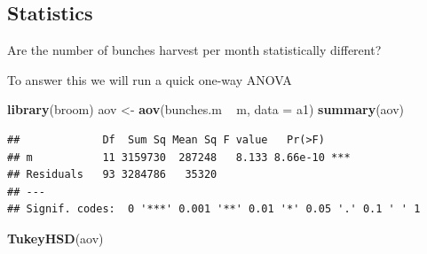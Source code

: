 \documentclass[]{book}
\newenvironment{Shaded}{\begin{snugshade}}{\end{snugshade}}
\newcommand{\KeywordTok}[1]{\textcolor[rgb]{0.13,0.29,0.53}{\textbf{{#1}}}}
\newcommand{\DataTypeTok}[1]{\textcolor[rgb]{0.13,0.29,0.53}{{#1}}}
\newcommand{\StringTok}[1]{\textcolor[rgb]{0.31,0.60,0.02}{{#1}}}
\newcommand{\NormalTok}[1]{{#1}}
\theoremstyle{definition}
\theoremstyle{definition}
\theoremstyle{remark}
\begin{document}
\subsection{Statistics}\label{statistics}

Are the number of bunches harvest per month statistically different?

To answer this we will run a quick one-way ANOVA

\begin{Shaded}
\begin{Highlighting}[]
\KeywordTok{library}\NormalTok{(broom)}
\NormalTok{aov <-}\StringTok{ }\KeywordTok{aov}\NormalTok{(bunches.m ~}\StringTok{ }\NormalTok{m, }\DataTypeTok{data =} \NormalTok{a1)}
\KeywordTok{summary}\NormalTok{(aov)}
\end{Highlighting}
\end{Shaded}

\begin{verbatim}
##             Df  Sum Sq Mean Sq F value   Pr(>F)    
## m           11 3159730  287248   8.133 8.66e-10 ***
## Residuals   93 3284786   35320                     
## ---
## Signif. codes:  0 '***' 0.001 '**' 0.01 '*' 0.05 '.' 0.1 ' ' 1
\end{verbatim}

\begin{Shaded}
\begin{Highlighting}[]
\KeywordTok{TukeyHSD}\NormalTok{(aov)}
\end{Highlighting}
\end{Shaded}
\end{document}
